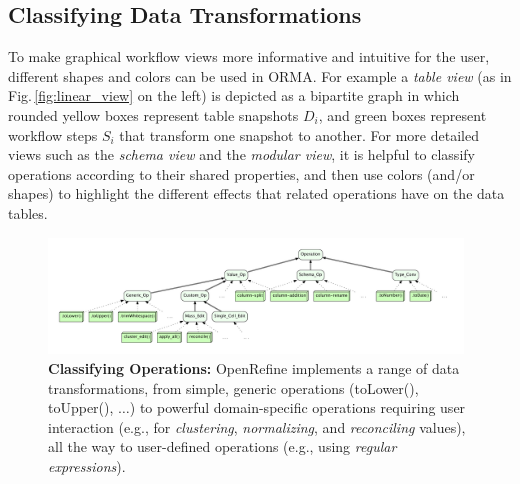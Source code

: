 \documentclass[conference]{ijdc-v14}
\newcommand{\figref}[1]{Fig.\,\ref{#1}}
\newcommand{\orma}{\textsf{ORMA}\xspace}  %
\newcommand{\openrefine}{\textrm{OpenRefine}\xspace}
\newcommand{\co}[1]{\textsf{\small{#1}}}
\begin{document}





\subsection{Classifying Data Transformations}

To make graphical workflow views more informative and intuitive for the user, different shapes and
colors can be used in \orma. For example a \emph{table view} (as in
\figref{fig:linear_view} on the left) is depicted as a bipartite graph in which rounded yellow boxes represent
table snapshots $D_i$, and green boxes represent workflow steps $S_i$ that transform one snapshot to
another. For more detailed views such as the \emph{schema view} and the \emph{modular view}, it is
helpful to classify operations according to their shared properties, and then use colors (and/or
shapes) to highlight the different effects that related operations have on the data tables.

\begin{figure}[t]
\centering
\includegraphics[width=0.98\textwidth]{idcc2021/figures/or_op_BL.pdf} 
\caption{\textbf{Classifying Operations:} \openrefine implements a range of data transformations,
  from simple, generic operations (\co{toLower()}, \co{toUpper()}, $\dots$) to powerful
  domain-specific operations requiring user interaction (e.g., for \emph{clustering},
  \emph{normalizing}, and \emph{reconciling} values), all the way to user-defined operations (e.g., using
  \emph{regular expressions}).}
\label{fig:class-operation}
\end{figure} 
\end{document}
